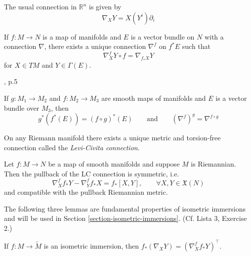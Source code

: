 \begin{example}
\label{example-euclidean-connection}
The usual connection in $\mathbb{R}^n$ is given by 
$$
\nabla_XY=X(Y^i)\partial_i
$$
\end{example}

\begin{proposition}
\label{proposition-existence-of-pullback-connection}
If $f:M \to N$ is a map of manifolds
and $E$ is a vector bundle on $N$
with a connection $\nabla$,
there exists a unique connection $\nabla^f$ on $f^*E$ such that
$$
\nabla^f_XY\circ f=\nabla_{f_*X}Y
$$
for $X \in TM$ and $Y \in \Gamma(E)$.
\end{proposition}

\begin{lemma}
\label{lemma-composition-of-pullback-connections}
\begin{reference}
\cite{aulas}, p.5 
\end{reference}
If $g:M_1\to M_2$ and $f:M_2\to M_3$ are smooth maps of 
manifolds and $E$ is a vector bundle over $M_3$, then
$$
g^* (f^* (E))=(f\circ g)^* (E)\qquad \text{and}\qquad
(\nabla^f)^g=\nabla^{f\circ g}
$$
\end{lemma}

\begin{proposition}
\label{proposition-existence-of-levi-civita}
On any Riemann manifold
there exists a unique metric and torsion-free
connection called the {\it Levi-Civita connection}.
\end{proposition}

\begin{proposition}
\label{proposition-symmetry-and-compatibility}
Let $f:M \to N$ be a map of smooth manifolds and suppose $M$ is Riemannian.
Then the pullback of the LC connection is symmetric, i.e.
\begin{equation}
\label{equation-pullback-connection-symmetric}
\nabla^f_X f_*Y-\nabla^f_Yf_*X = f_*[X,Y],\qquad 
\forall X,Y \in \mathfrak{X}(N)
\end{equation}
and compatible with the pullback Riemannian metric.
\end{proposition}

The following three lemmas are fundamental properties of isometric
immersions and will be used in Section \ref{section-isometric-immersions}. (Cf.
Lista 3, Exercise 2.)

\begin{lemma}
\label{lemma-tangent-component-of-pullback-connection-by-ii-is-LC}
If $f:M \to \tilde{M}$ is an isometric immersion, then 
$f_*(\nabla_XY)=(\nabla^f_Xf_*Y)^\top$.
\end{lemma}

